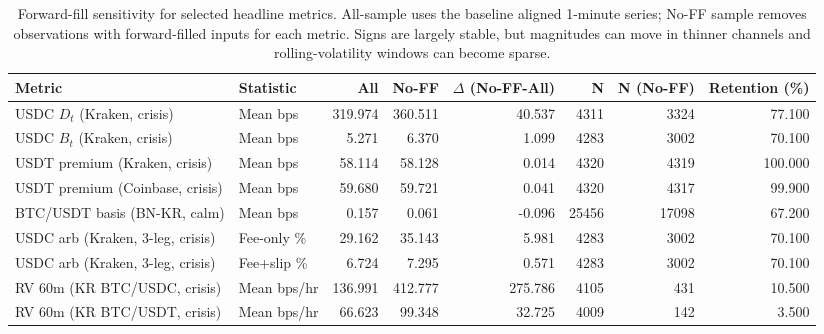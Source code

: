 \begin{table}[H]
\caption{Forward-fill sensitivity for selected headline metrics. All-sample uses the baseline aligned 1-minute series; No-FF sample removes observations with forward-filled inputs for each metric. Signs are largely stable, but magnitudes can move in thinner channels and rolling-volatility windows can become sparse.}
\label{tab:ff_sensitivity}
\footnotesize
\setlength{\tabcolsep}{4pt}
\begin{tabularx}{\textwidth}{>{\raggedright\arraybackslash}X>{\raggedright\arraybackslash}p{1.90cm}rrrrrr}
\toprule
Metric & Statistic & All & No-FF & $\Delta$ (No-FF-All) & N & N (No-FF) & Retention (\%) \\
\midrule
USDC $D_t$ (Kraken, crisis) & Mean bps & 319.974 & 360.511 & 40.537 & 4311 & 3324 & 77.100 \\
USDC $B_t$ (Kraken, crisis) & Mean bps & 5.271 & 6.370 & 1.099 & 4283 & 3002 & 70.100 \\
USDT premium (Kraken, crisis) & Mean bps & 58.114 & 58.128 & 0.014 & 4320 & 4319 & 100.000 \\
USDT premium (Coinbase, crisis) & Mean bps & 59.680 & 59.721 & 0.041 & 4320 & 4317 & 99.900 \\
BTC/USDT basis (BN-KR, calm) & Mean bps & 0.157 & 0.061 & -0.096 & 25456 & 17098 & 67.200 \\
USDC arb (Kraken, 3-leg, crisis) & Fee-only \% & 29.162 & 35.143 & 5.981 & 4283 & 3002 & 70.100 \\
USDC arb (Kraken, 3-leg, crisis) & Fee+slip \% & 6.724 & 7.295 & 0.571 & 4283 & 3002 & 70.100 \\
RV 60m (KR BTC/USDC, crisis) & Mean bps/hr & 136.991 & 412.777 & 275.786 & 4105 & 431 & 10.500 \\
RV 60m (KR BTC/USDT, crisis) & Mean bps/hr & 66.623 & 99.348 & 32.725 & 4009 & 142 & 3.500 \\
\bottomrule
\end{tabularx}
\end{table}
